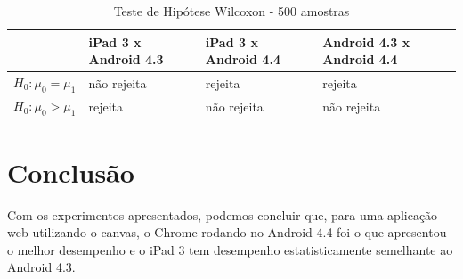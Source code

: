 \documentclass[11pt,a4paper]{article}
\begin{document}
\begin{table}[H]
    \footnotesize
    \caption{Teste de Hipótese Wilcoxon - 500 amostras}
    \begin{tabular}{| l | l | l | l |}
    \hline
     & iPad 3 x Android 4.3 & iPad 3 x Android 4.4 & Android 4.3 x Android 4.4 \\ \hline
    \( H_0: \mu_0 = \mu_1 \) & não rejeita & rejeita & rejeita \\ \hline
    \( H_0: \mu_0 > \mu_1 \) & rejeita & não rejeita & não rejeita \\ \hline
    \end{tabular}
    \label{tabela1}
\end{table}

\section{Conclusão}\label{conclusao}

Com os experimentos apresentados, podemos concluir que, para uma aplicação web utilizando o canvas, o Chrome rodando no
Android 4.4 foi o que apresentou o melhor desempenho e o iPad 3 tem desempenho estatisticamente semelhante ao Android
4.3.



\end{document}
